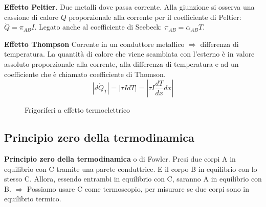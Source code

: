 \documentclass[a4paper]{article}
\numberwithin{equation}{section}%
\begin{document}
\textbf{Effetto Peltier}. Due metalli dove passa corrente. Alla giunzione si osserva una cassione di calore $\dot Q$ proporzionale alla corrente per il coefficiente di Peltier: $\dot Q=\pi _{AB}I$. Legato anche al  coefficiente di Seebeck: $\pi_{AB}=\alpha_{A B} T$.


\textbf{Effetto Thompson} 
Corrente in un conduttore metallico $\Longrightarrow$ differenza di temperatura. La quantità di calore che viene scambiata con l’esterno è in valore
assoluto proporzionale alla corrente, alla differenza di temperatura e ad un coefficiente che è chiamato coefficiente di Thomson.
$$\left|d \dot{Q}_{T}\right|=|\tau I d T|=\left|\tau I \frac{d T}{d x} d x\right|$$ 

\begin{figure}[H]
	\begin{center}
	\end{center}
				\caption{Frigoriferi a effetto termoelettrico}
\end{figure}


\subsection{Principio zero della termodinamica}

\textbf{Principio zero della termodinamica} o di Fowler. Presi due corpi A in equilibrio con C tramite una parete conduttrice. E il corpo B in equilibrio con lo stesso C. Allora, essendo entrambi in equilibrio con C, saranno A in equilibrio con B. $\Longrightarrow$ Possiamo usare C come termoscopio, per misurare se due corpi sono in equilibrio termico. 
\end{document}
